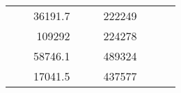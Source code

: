 \begin{table}[H]
\begin{tabular}{|ccrccrccc}
\multicolumn{1}{|c|}{\cellcolor[HTML]{FFFFC7}}                                & \multicolumn{1}{c|}{\cellcolor[HTML]{DAE8FC}}                      & \multicolumn{1}{r|}{\cellcolor[HTML]{DAE8FC}36191.7}   & \multicolumn{1}{c|}{\cellcolor[HTML]{FFFFC7}}                                & \multicolumn{1}{c|}{\cellcolor[HTML]{DAE8FC}}                       & \multicolumn{1}{r|}{\cellcolor[HTML]{DDFDFF}222249}    &                                                                              &                                                                    &                                                        \\ \cline{3-3} \cline{6-6}
\multicolumn{1}{|c|}{\cellcolor[HTML]{FFFFC7}}                                & \multicolumn{1}{c|}{\cellcolor[HTML]{DAE8FC}}                      & \multicolumn{1}{r|}{\cellcolor[HTML]{DDFDFF}109292}    & \multicolumn{1}{c|}{\cellcolor[HTML]{FFFFC7}}                                & \multicolumn{1}{c|}{\cellcolor[HTML]{DAE8FC}}                       & \multicolumn{1}{r|}{\cellcolor[HTML]{DAE8FC}224278}    &                                                                              &                                                                    &                                                        \\ \cline{3-3} \cline{6-6}
\multicolumn{1}{|c|}{\cellcolor[HTML]{FFFFC7}}                                & \multicolumn{1}{c|}{\cellcolor[HTML]{DAE8FC}}                      & \multicolumn{1}{r|}{\cellcolor[HTML]{DAE8FC}58746.1}   & \multicolumn{1}{c|}{\cellcolor[HTML]{FFFFC7}}                                & \multicolumn{1}{c|}{\cellcolor[HTML]{DAE8FC}}                       & \multicolumn{1}{r|}{\cellcolor[HTML]{DDFDFF}489324}    &                                                                              &                                                                    &                                                        \\ \cline{3-3} \cline{6-6}
\multicolumn{1}{|c|}{\cellcolor[HTML]{FFFFC7}}                                & \multicolumn{1}{c|}{\cellcolor[HTML]{DAE8FC}}                      & \multicolumn{1}{r|}{\cellcolor[HTML]{DDFDFF}17041.5}   & \multicolumn{1}{c|}{\cellcolor[HTML]{FFFFC7}}                                & \multicolumn{1}{c|}{\cellcolor[HTML]{DAE8FC}}                       & \multicolumn{1}{r|}{\cellcolor[HTML]{DAE8FC}437577}    &                                                                              &                                                                    &                                                        \\ \cline{3-3} \cline{6-6}

\end{tabular}
\end{table}
